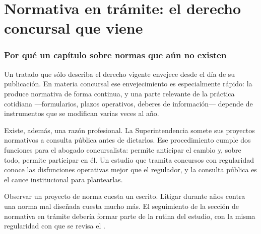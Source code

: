 \chapter{Normativa en trámite: el derecho concursal que viene}
\label{cap:normativa-tramite}


\bloqueTeorico

\subsection{Por qué un capítulo sobre normas que aún no existen}

Un tratado que sólo describa el derecho vigente envejece desde el día de su publicación.
En materia concursal ese envejecimiento es especialmente rápido: la \superir{} produce
normativa de forma continua, y una parte relevante de la práctica cotidiana ---formularios,
plazos operativos, deberes de información--- depende de instrumentos que se modifican
varias veces al año.

Existe, además, una razón profesional. La Superintendencia somete sus proyectos
normativos a consulta pública antes de dictarlos. Ese procedimiento cumple dos funciones
para el abogado concursalista: permite anticipar el cambio y, sobre todo, permite
participar en él. Un estudio que tramita concursos con regularidad conoce las
disfunciones operativas mejor que el regulador, y la consulta pública es el cauce
institucional para plantearlas.

\begin{foco}
Observar un proyecto de norma cuesta un escrito. Litigar durante años contra una norma
mal diseñada cuesta mucho más. El seguimiento de la sección de normativa en trámite
debería formar parte de la rutina del estudio, con la misma regularidad con que se revisa
el \boletin{}.
\end{foco}

